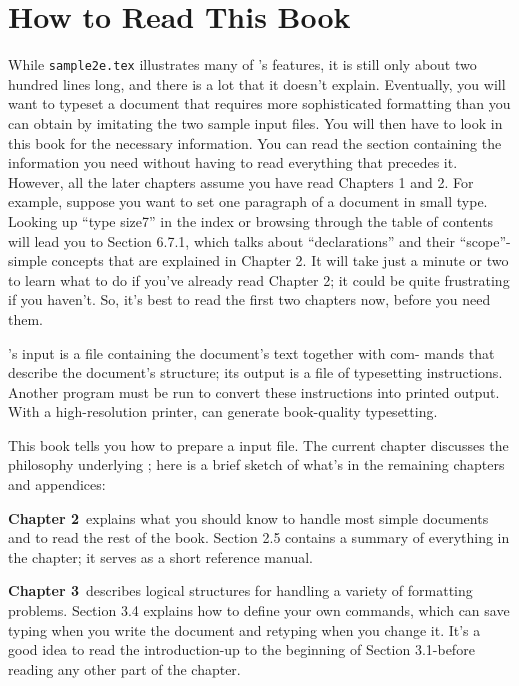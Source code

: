 \section{How to Read This Book}
While \texttt{sample2e.tex} illustrates many of \ltx{}'s features, it is still only about
two hundred lines long, and there is a lot that it doesn't explain. Eventually,
you will want to typeset a document that requires more sophisticated formatting
than you can obtain by imitating the two sample input files. You will then have
to look in this book for the necessary information. You can read the section
containing the information you need without having to read everything that
precedes it. However, all the later chapters assume you have read Chapters 1
and 2. For example, suppose you want to set one paragraph of a document in
small type. Looking up ``type size7'' in the index or browsing through the table
of contents will lead you to Section 6.7.1, which talks about ``declarations'' and
their ``scope''-simple concepts that are explained in Chapter 2. It will take just
a minute or two to learn what to do if you've already read Chapter 2; it could
be quite frustrating if you haven't. So, it's best to read the first two chapters
now, before you need them.


\ltx{}'s input is a file containing the document's text together with com-
mands that describe the document's structure; its output is a file of typesetting
instructions. Another program must be run to convert these instructions into
printed output. With a high-resolution printer, \ltx{} can generate book-quality
typesetting.

This book tells you how to prepare a \ltx{}input file. The current chapter
discusses the philosophy underlying \ltx{}; here is a brief sketch of what's in the
remaining chapters and appendices:

\def\listSketch#1#2{%
\bigskip\noindent\textbf{#1}~#2\par
}

\listSketch{Chapter 2}{explains what you should know to handle most simple documents
and to read the rest of the book. Section 2.5 contains a summary of
everything in the chapter; it serves as a short reference manual.}

\listSketch{Chapter 3}{describes logical structures for handling a variety of formatting
problems. Section 3.4 explains how to define your own commands, which
can save typing when you write the document and retyping when you
change it. It's a good idea to read the introduction-up
to the beginning of Section 3.1-before reading any other part of the chapter.}

